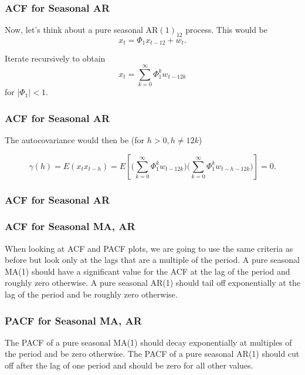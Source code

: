 \documentclass[%
xcolor=pdftex]{beamer}
\begin{document}
\begin{frame}
\frametitle{ACF for Seasonal AR}

Now, let's think about a pure seasonal AR$(1)_{12}$ process.  This would be
$$
x_t= \Phi_1 x_{t-12}+w_t.
$$

Iterate recursively to obtain
$$
x_t= \sum_{k=0}^\infty \Phi_1^k w_{t-12k}
$$
for $|\Phi_1|<1$.
\end{frame}

\begin{frame}
\frametitle{ACF for Seasonal AR}

The autocovariance would then be (for $h>0, h\neq12k$)

$$
\gamma(h)=E(x_t x_{t-h})=E\left[ \Big ( \sum_{k=0}^\infty \Phi_1^k w_{t-12k} \Big )\Big ( \sum_{k=0}^\infty \Phi_1^k w_{t-h-12k} \Big )\right]=0.
$$

\end{frame}

\begin{frame}
\frametitle{ACF for Seasonal AR}



\end{frame}

\begin{frame}
\frametitle{ACF for Seasonal MA, AR}

When looking at ACF and PACF plots, we are going
to use the same criteria as before but look only at the
lags that are a multiple of the period.  A pure seasonal MA(1)
should have a significant value for the ACF at the
lag of the period and roughly zero otherwise.  A pure seasonal
AR(1) should tail off exponentially at the lag of the period and
 be roughly zero otherwise.

\end{frame}

\begin{frame}
\frametitle{PACF for Seasonal MA, AR}

The PACF of a pure seasonal MA(1) should decay exponentially
 at multiples of the period and be zero otherwise.
 The PACF of a pure seasonal AR(1) should cut off after the
 lag of one period and should be zero for all other values.

\end{frame}
\end{document}
